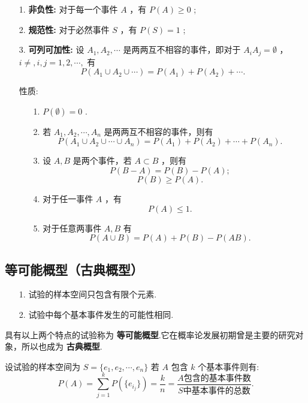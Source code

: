 \documentclass[UTF8,10pt]{ctexart}
\begin{document}
	\begin{enumerate}
		\item [1.] \textbf{非负性:} 对于每一个事件 $ A $ ，有 $ P(A) \ge 0 $ ;
		\item [2.] \textbf{规范性:} 对于必然事件 $ S $ ，有 $ P(S)=1 $ ;
		\item [3.] \textbf{可列可加性:} 设 $ A_{1},A_{2}, \cdots $ 是两两互不相容的事件，即对于 $ A_{i}A_{j}= \emptyset $ ， $ i \neq ,i,j=1,2, \cdots , $ 有 $$ P(A_{1} \cup A_{2} \cup \cdots)=P(A_{1})+P(A_{2})+ \cdots . $$ 
	\end{enumerate}

	\begin{itemize}
		\item [性质:] {
			\begin{enumerate}
				\item [1.]  $ P( \emptyset )=0 $ .
				\item [2.] 若 $ A_{1},A_{2}, \cdots ,A_{n} $ 是两两互不相容的事件，则有 $$ P(A_{1} \cup A_{2} \cup \cdots \cup A_{n})=P(A_{1})+P(A_{2})+ \cdots +P(A_{n}). $$ 
				\item [3.] 设 $ A,B $ 是两个事件，若 $ A \subset B $ ，则有 $$ P(B-A)=P(B)-P(A); $$ $$ P(B) \ge P(A). $$ 
				\item [4.] 对于任一事件 $ A $ ，有 $$ P(A) \le 1. $$ 
				\item [5.] 对于任意两事件 $ A,B $ 有 $$ P(A \cup B)=P(A)+P(B)-P(AB). $$ 
			\end{enumerate}
		}
	\end{itemize}
	
	\subsection{等可能概型（古典概型）}
	
	\begin{enumerate}
		\item [1.] {试验的样本空间只包含有限个元素.}
		\item [2.] {试验中每个基本事件发生的可能性相同.}
	\end{enumerate}

	具有以上两个特点的试验称为 \textbf{等可能概型}.它在概率论发展初期曾是主要的研究对象，所以也成为 \textbf{古典概型}.
	
	设试验的样本空间为 $ S=\{e_{1},e_{2}, \cdots ,e_{n}\}$ 若 $ A $ 包含 $ k $ 个基本事件则有: \\ $$ P(A)=\sum\limits_{j=1}^{k}P(\{e_{i_{j}}\})= \frac{k}{n} = \frac{A \mbox{包含的基本事件数} }{S \mbox{中基本事件的总数} }. $$ 
	
\end{document}
